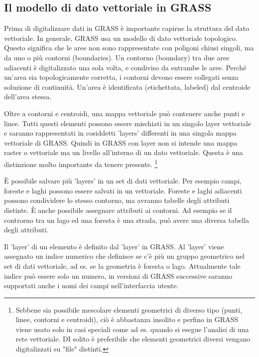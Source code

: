 \subsection{Il modello di dato vettoriale in GRASS}\label{label_vectmodel}

Prima di digitalizzare dati in GRASS è importante capirne la struttura del
dato vettoriale. In generale, GRASS usa un modello di
dato vettoriale topologico. Questo significa che le aree
non sono rappresentate con poligoni chiusi singoli, ma da uno o più contorni
(boundaries). Un  contorno (boundary) tra due aree adiacenti è digitalizzato una
sola volta, e condiviso da entrambe le aree. Perché un'area sia
topologicamente corretta, i contorni devono essere collegati senza soluzione di
continuità. Un'area è identificata (etichettata, labeled) dal centroide
dell'area stessa.

Oltre a contorni e centroidi, una mappa vettoriale può contenere anche punti e
linee. Tutti questi elementi possono essere mischiati in un singolo layer
vettoriale e saranno rappresentati in cosiddetti 'layers' differenti in una
singola mappa vettoriale di GRASS. Quindi in GRASS con  layer non si intende
una mappa raster o vettoriale ma un livello all'interno di un dato vettoriale.
Questa è una distinzione molto importante da tenere presente.
\footnote{Sebbene sia possibile mescolare elementi geometrici di diverso tipo
(punti, linee, contorni e centroidi), ciò è abbastanza insolito e perfino in
GRASS viene usato solo in casi speciali come ad es. quando si esegue l'analisi
di una rete vettoriale. DI solito è preferibile che elementi geometrici
diversi vengano digitalizzati su "file" distinti.}

È possibile salvare più 'layers' in un set di dati vettoriale. Per esempio
campi, foreste e laghi possono essere salvati in un vettoriale. Foreste e
laghi adiacenti possono condividere lo stesso contorno, ma avranno tabelle degli
attributi distinte. È anche possibile assegnare attributi ai contorni. Ad
esempio se il controrno tra un lago ed una foresta è una strada, può avere una
diversa tabella degli attributi.
 
Il 'layer' di un elemento è definito dal 'layer' in GRASS. Al 'layer' viene
assegnato un indice numerico che definisce se c'è più un gruppo geometrico nel set di dati
vettoriale, ad es. se la geometria è foresta o lago. Attualmente tale indice può essere
solo un numero, in versioni di GRASS successive saranno supportati anche i
nomi dei campi nell'interfaccia utente.

